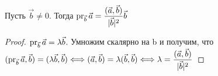 \begin{proposition}
	Пусть \(\vec{b}\ne0\). Тогда \(\operatorname{pr}_{\vec{b}}\vec{a} = \dfrac{(\vec{a}, \vec{b})}{|\vec{b}|^2}\vec{b}\)
\end{proposition}
\begin{proof}
	\(\operatorname{pr}_{\vec{b}}\vec{a} = \lambda \vec{b}\). Умножим скалярно на b и получим, что 
	\((\operatorname{pr}_{\vec{b}}\vec{a}, \vec{b}) = (\lambda \vec{b}, \vec{b})\Longleftrightarrow (\vec{a}, \vec{b}) = \lambda (\vec{b}, \vec{b})\Longleftrightarrow \lambda = \dfrac{(\vec{a},\vec{b})}{|\vec{b}|^2}\)
\end{proof}

